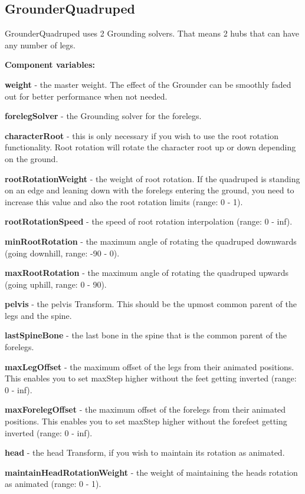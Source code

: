 \hypertarget{page11_quadruped}{}\subsection{Grounder\+Quadruped}\label{page11_quadruped}
Grounder\+Quadruped uses 2 Grounding solvers. That means 2 hubs that can have any number of legs.

{\bfseries Component variables\+:}
\begin{DoxyItemize}
\item {\bfseries weight} -\/ the master weight. The effect of the Grounder can be smoothly faded out for better performance when not needed.
\item {\bfseries foreleg\+Solver} -\/ the Grounding solver for the forelegs.
\item {\bfseries character\+Root} -\/ this is only necessary if you wish to use the root rotation functionality. Root rotation will rotate the character root up or down depending on the ground.
\item {\bfseries root\+Rotation\+Weight} -\/ the weight of root rotation. If the quadruped is standing on an edge and leaning down with the forelegs entering the ground, you need to increase this value and also the root rotation limits (range\+: 0 -\/ 1).
\item {\bfseries root\+Rotation\+Speed} -\/ the speed of root rotation interpolation (range\+: 0 -\/ inf).
\item {\bfseries min\+Root\+Rotation} -\/ the maximum angle of rotating the quadruped downwards (going downhill, range\+: -\/90 -\/ 0).
\item {\bfseries max\+Root\+Rotation} -\/ the maximum angle of rotating the quadruped upwards (going uphill, range\+: 0 -\/ 90).
\item {\bfseries pelvis} -\/ the pelvis Transform. This should be the upmost common parent of the legs and the spine.
\item {\bfseries last\+Spine\+Bone} -\/ the last bone in the spine that is the common parent of the forelegs.
\item {\bfseries max\+Leg\+Offset} -\/ the maximum offset of the legs from their animated positions. This enables you to set max\+Step higher without the feet getting inverted (range\+: 0 -\/ inf).
\item {\bfseries max\+Foreleg\+Offset} -\/ the maximum offset of the forelegs from their animated positions. This enables you to set max\+Step higher without the forefeet getting inverted (range\+: 0 -\/ inf).
\item {\bfseries head} -\/ the head Transform, if you wish to maintain it\textquotesingle{}s rotation as animated.
\item {\bfseries maintain\+Head\+Rotation\+Weight} -\/ the weight of maintaining the head\textquotesingle{}s rotation as animated (range\+: 0 -\/ 1).
\end{DoxyItemize}

 